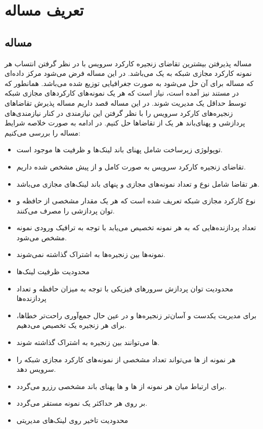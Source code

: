\chapter{تعریف مساله}

\section{مساله}
مساله
پذیرفتن بیشترین تقاضای زنجیره‌ کارکرد سرویس با در نظر گرفتن انتساب هر نمونه کارکرد مجازی شبکه به یک  می‌باشد.
در این مساله فرض می‌شود مرکز داده‌ای که مساله برای آن حل می‌شود به صورت جغرافیایی توزیع شده می‌باشد.
همانطور که در مستند \cite{ETSI-MAN} نیز آمده است، نیاز است که هر یک نمونه‌های کارکردهای مجازی شبکه
توسط حداقل یک  مدیریت شوند.
در این مساله قصد داریم مساله پذیرش تقاضاهای زنجیره‌های کارکرد سرویس را با نظر گرفتن این نیازمندی در کنار
نیازمندی‌های پردازشی و پهنای‌باند هر یک از تقاضاها حل کنیم.
در ادامه به صورت خلاصه شرایط مساله را بررسی می‌کنیم:

\begin{itemize}
    \item توپولوژی زیرساخت شامل پهنای باند لینک‌ها و ظرفیت ها موجود است.
    \item {} تقاضای زنجیره‌ کارکرد سرویس به صورت کامل و از پیش مشخص شده داریم.
    \item هر تقاضا شامل نوع و تعداد نمونه‌های مجازی و پنهای باند لینک‌های مجازی می‌باشد.
    \item {} نوع کارکرد مجازی شبکه تعریف شده است که هر یک مقدار مشخصی از حافظه و توان پردازشی را مصرف می‌کنند.
    \item تعداد پردازنده‌هایی که به هر نمونه تخصیص می‌یابد با توجه به ترافیک ورودی نمونه مشخص می‌شود.
    \item نمونه‌ها بین زنجیره‌ها به اشتراک گذاشته نمی‌شوند.
    \item محدودیت ظرفیت لینک‌ها
    \item محدودیت توان پردازش سرورهای فیزیکی با توجه به میزان حافظه و تعداد پردازنده‌ها
    \item برای مدیریت یکدست و آسان‌تر زنجیره‌ها و در عین حال جمع‌آوری راحت‌تر خطاها، برای هر زنجیره یک  تخصیص می‌دهیم.
    \item {}ها می‌توانند بین زنجیره به اشتراک گذاشته شوند.
    \item هر نمونه از ها می‌تواند تعداد مشخصی از نمونه‌های کارکرد مجازی شبکه را سرویس دهد. 
    \item برای ارتباط میان هر نمونه از ها و ها پهنای باند مشخصی رزرو می‌گردد.
    \item بر روی هر  حداکثر یک نمونه  مستقر می‌گردد.
    \item محدودیت تاخیر روی لینک‌های مدیریتی
\end{itemize}

